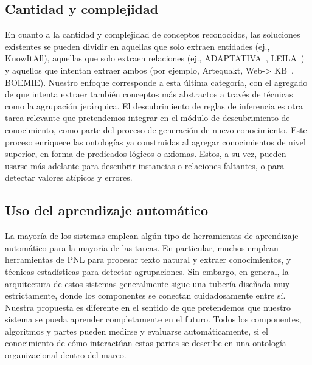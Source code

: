 \subsection{Cantidad y complejidad}

En cuanto a la cantidad y complejidad de conceptos reconocidos, las soluciones existentes se pueden dividir en aquellas que solo extraen entidades (ej., KnowItAll), aquellas que solo extraen relaciones (ej., ADAPTATIVA~\cite{adaptativa}, LEILA~\cite{leila}) y aquellos que intentan extraer ambos (por ejemplo, Artequakt, Web-> KB~\cite{webkb}, BOEMIE).
Nuestro enfoque corresponde a esta última categoría, con el agregado de que intenta extraer también conceptos más abstractos a través de técnicas como la agrupación jerárquica.
El descubrimiento de reglas de inferencia es otra tarea relevante que pretendemos integrar en el módulo de descubrimiento de conocimiento, como parte del proceso de generación de nuevo conocimiento.
Este proceso enriquece las ontologías ya construidas al agregar conocimientos de nivel superior, en forma de predicados lógicos o axiomas.
Estos, a su vez, pueden usarse más adelante para descubrir instancias o relaciones faltantes, o para detectar valores atípicos y errores.


\subsection{Uso del aprendizaje automático}

La mayoría de los sistemas emplean algún tipo de herramientas de aprendizaje automático para la mayoría de las tareas. En particular, muchos emplean herramientas de PNL para procesar texto natural y extraer conocimientos, y técnicas estadísticas para detectar agrupaciones.
Sin embargo, en general, la arquitectura de estos sistemas generalmente sigue una tubería diseñada muy estrictamente, donde los componentes se conectan cuidadosamente entre sí. Nuestra propuesta es diferente en el sentido de que pretendemos que nuestro sistema se pueda aprender completamente en el futuro.
Todos los componentes, algoritmos y partes pueden medirse y evaluarse automáticamente, si el conocimiento de cómo interactúan estas partes se describe en una ontología organizacional dentro del marco.


